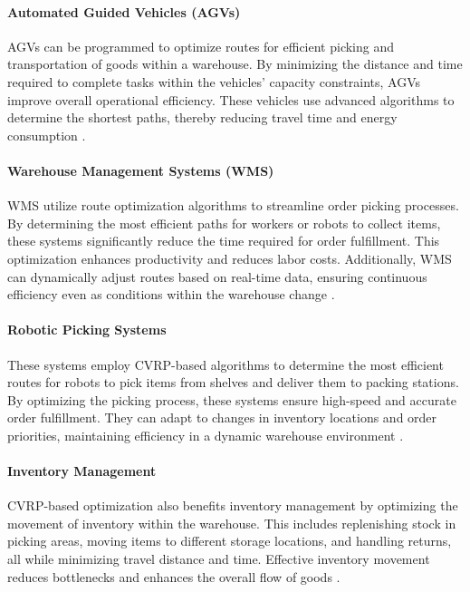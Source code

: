 \documentclass[
]{article}
\begin{document}
\paragraph{Automated Guided Vehicles (AGVs)} 
AGVs can be programmed to optimize routes for efficient picking and transportation of goods within a warehouse. By minimizing the distance and time required to complete tasks within the vehicles' capacity constraints, AGVs improve overall operational efficiency. These vehicles use advanced algorithms to determine the shortest paths, thereby reducing travel time and energy consumption \cite{agv_optimization}.

\paragraph{Warehouse Management Systems (WMS)}
WMS utilize route optimization algorithms to streamline order picking processes. By determining the most efficient paths for workers or robots to collect items, these systems significantly reduce the time required for order fulfillment. This optimization enhances productivity and reduces labor costs. Additionally, WMS can dynamically adjust routes based on real-time data, ensuring continuous efficiency even as conditions within the warehouse change \cite{wms_optimization}.

\paragraph{Robotic Picking Systems}
These systems employ CVRP-based algorithms to determine the most efficient routes for robots to pick items from shelves and deliver them to packing stations. By optimizing the picking process, these systems ensure high-speed and accurate order fulfillment. They can adapt to changes in inventory locations and order priorities, maintaining efficiency in a dynamic warehouse environment \cite{robotic_picking}.

\paragraph{Inventory Management}
CVRP-based optimization also benefits inventory management by optimizing the movement of inventory within the warehouse. This includes replenishing stock in picking areas, moving items to different storage locations, and handling returns, all while minimizing travel distance and time. Effective inventory movement reduces bottlenecks and enhances the overall flow of goods \cite{inventory_management}.
\end{document}
